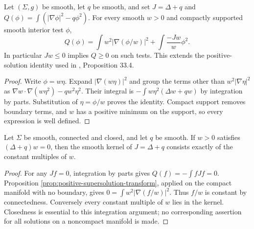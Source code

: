 \begin{proposition}\label{prop:positive-supersolution-transform}
Let $(\Sigma,g)$ be smooth, let $q$ be smooth, and set $J=\Delta+q$ and $Q(\phi)=\int(|\nabla\phi|^2-q\phi^2)$. For every smooth $w>0$ and compactly supported smooth interior test $\phi$,
\[
 Q(\phi)=\int w^2|\nabla(\phi/w)|^2+\int\frac{-Jw}{w}\phi^2.
\]
In particular $Jw\leq0$ implies $Q\geq0$ on such tests. This extends the positive-solution identity used in \cite{ChMin}, Proposition 33.4.
\end{proposition}
\begin{proof}
Write $\phi=w\eta$. Expand $|\nabla(w\eta)|^2$ and group the terms other than $w^2|\nabla\eta|^2$ as $\nabla w\cdot\nabla(w\eta^2)-qw^2\eta^2$. Their integral is $-\int w\eta^2(\Delta w+qw)$ by integration by parts. Substitution of $\eta=\phi/w$ proves the identity. Compact support removes boundary terms, and $w$ has a positive minimum on the support, so every expression is well defined.
\end{proof}

\begin{proposition}\label{prop:positive-jacobi-simple-kernel}
Let $\Sigma$ be smooth, connected and closed, and let $q$ be smooth. If $w>0$ satisfies $(\Delta+q)w=0$, then the smooth kernel of $J=\Delta+q$ consists exactly of the constant multiples of $w$.
\end{proposition}
\begin{proof}
For any $Jf=0$, integration by parts gives $Q(f)=-\int fJf=0$. Proposition \ref{prop:positive-supersolution-transform}, applied on the compact manifold with no boundary, gives $0=\int w^2|\nabla(f/w)|^2$. Thus $f/w$ is constant by connectedness. Conversely every constant multiple of $w$ lies in the kernel. Closedness is essential to this integration argument; no corresponding assertion for all solutions on a noncompact manifold is made.
\end{proof}

